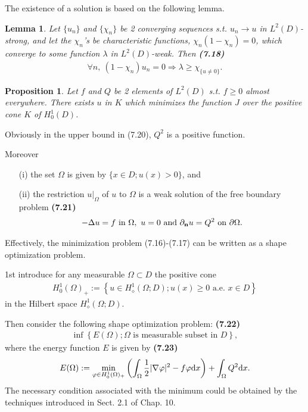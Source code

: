 \documentclass{book}
\numberwithin{equation}{section}
\newtheorem{lemma}{Lemma}[section]
\newtheorem{proposition}{Proposition}[section]
\begin{document}
\begin{enumerate}
    The existence of a solution is based on the following lemma.
    
    \begin{lemma}
        Let $\{u_n\}$ and $\{\chi_n\}$ be 2 converging sequences s.t. $u_n\to u$ in $L^2(D)$-strong, and let the $\chi_n$'s be characteristic functions, $\chi_n(1 - \chi_n) = 0$, which converge to some function $\lambda$ in $L^2(D)$-weak. Then \textbf{(7.18)}
        \begin{align*}
            \forall n,\ \left(1 - \chi_n\right)u_n = 0\Rightarrow\lambda\ge\chi_{\{u\ne 0\}}.
        \end{align*}
    \end{lemma}

    \begin{proposition}
        Let $f$ and $Q$ be 2 elements of $L^2(D)$ s.t. $f\ge 0$ almost everywhere. There exists $u$ in $K$ which minimizes the function $J$ over the positive cone $K$ of $H_0^1(D)$.
    \end{proposition}

    Obviously in the upper bound in (7.20), $Q^2$ is a positive function.
    
    Moreover
    \begin{itemize}
        \item[(i)] the set $\Omega$ is given by $\{x\in D;u(x) > 0\}$, and
        \item[(ii)] the restriction $u|_\Omega$ of $u$ to $\Omega$ is a weak solution of the free boundary problem \textbf{(7.21)}
        \begin{align*}
            -\Delta u = f \mbox{ in } \Omega,\ u = 0 \mbox{ and } \partial_{\bf n}u = Q^2 \mbox{ on } \partial\Omega.
        \end{align*}
    \end{itemize}
    Effectively, the minimization problem (7.16)-(7.17) can be written as a shape optimization problem.
    
    1st introduce for any measurable $\Omega\subset D$ the positive cone
    \begin{align*}
        H_0^1(\Omega)_+ := \left\{u\in H_\diamond^1(\Omega;D);u(x)\ge 0 \mbox{ a.e. } x\in D\right\}
    \end{align*}
    in the Hilbert space $H_\diamond^1(\Omega;D)$.
    
    Then consider the following shape optimization problem: \textbf{(7.22)}
    \begin{align*}
        \inf\left\{E(\Omega);\Omega \mbox{ is measurable subset in } D\right\},
    \end{align*}
    where the energy function $E$ is given by \textbf{(7.23)}
    \begin{align*}
        E(\Omega) := \min_{\varphi\in H_0^1(\Omega)_+} \left(\int_\Omega \frac{1}{2}|\nabla\varphi|^2 - f\varphi{\rm d}x\right) + \int_\Omega Q^2{\rm d}x.
    \end{align*}
    The necessary condition associated with the minimum could be obtained by the techniques introduced in Sect. 2.1 of Chap. 10.
    

\end{enumerate}
\end{document}
